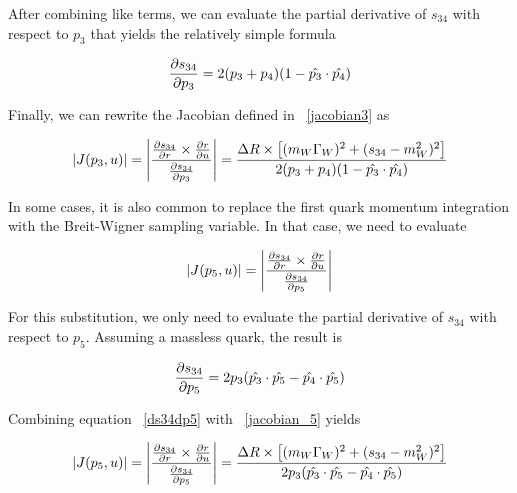 After combining like terms, we can evaluate the partial derivative of $s_{34}$
with respect to $p_{3}$ that yields the relatively
simple formula

\begin{equation}
\label{ds34dp3}
\frac{\partial s_{34}}{\partial p_{3}} = 2(p_{3} + p_{4})(1 - \hat{p_{3}} \cdot \hat{p_{4}})
\end{equation}

Finally, we can rewrite the Jacobian defined in ~\ref{jacobian3} as

\begin{equation}
\label{jacobian4}
|J(p_{3}, u)| = \left | \frac{\frac{\partial s_{34}}{\partial r} \times
\frac{\partial r}{\partial u}}{\frac{\partial s_{34}}{\partial p_{3}}} \right | = \frac{\Delta R \times \left[
(m_{W}\Gamma_{W})^{2} + (s_{34} - m_{W}^{2})^{2} \right]}{2(p_{3} + p_{4})(1 - \hat{p_{3}} \cdot \hat{p_{4}})}
\end{equation}

In some cases, it is also common to replace the first quark momentum integration
with the Breit-Wigner sampling variable. In that case, we need to evaluate

\begin{equation}
\label{jacobian_5}
|J(p_{5}, u)| = \left | \frac{\frac{\partial s_{34}}{\partial r} \times
\frac{\partial r}{\partial u}}{\frac{\partial s_{34}}{\partial p_{5}}} \right |
\end{equation}

For this substitution, we only need to evaluate the partial derivative of
$s_{34}$ with respect to $p_{5}$. Assuming a massless quark, the result is

\begin{equation}
\label{ds34dp5}
\frac{\partial s_{34}}{\partial p_{5}} = 2p_{3}(\hat{p_{3}} \cdot \hat{p_{5}} - \hat{p_{4}} \cdot \hat{p_{5}})
\end{equation}

Combining equation ~\ref{ds34dp5} with ~\ref{jacobian_5} yields

\begin{equation}
\label{jacobian_6}
|J(p_{5}, u)| = \left | \frac{\frac{\partial s_{34}}{\partial r} \times
\frac{\partial r}{\partial u}}{\frac{\partial s_{34}}{\partial p_{5}}} \right | = \frac{\Delta R \times \left[
(m_{W}\Gamma_{W})^{2} + (s_{34} - m_{W}^{2})^{2} \right]}{2p_{3}(\hat{p_{3}} \cdot \hat{p_{5}} - \hat{p_{4}} \cdot \hat{p_{5}})}
\end{equation}



%
%




